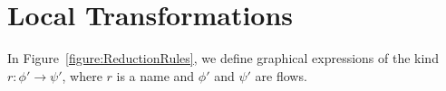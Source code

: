 

\section{Local Transformations}

\begin{definition}\label{definition:FlowGraphicalExpressions}
In Figure~\vref{figure:ReductionRules}, we define graphical expressions of the kind $r\colon\phi'\to\psi'$, where $r$ is a name and $\phi'$ and $\psi'$ are flows.
\end{definition}


